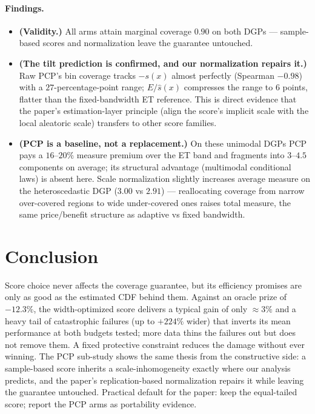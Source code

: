 \documentclass[11pt]{article}
\begin{document}
\paragraph{Findings.}
\begin{itemize}
  \item[\textbf{F5}] \textbf{(Validity.)} All arms attain marginal coverage
  $0.90$ on both DGPs --- sample-based scores and normalization leave the
  guarantee untouched.
  \item[\textbf{F6}] \textbf{(The tilt prediction is confirmed, and our
  normalization repairs it.)} Raw PCP's bin coverage tracks $-s(x)$ almost
  perfectly (Spearman $-0.98$) with a $27$-percentage-point range;
  $E/\hat s(x)$ compresses the range to $6$ points, flatter than the
  fixed-bandwidth ET reference. This is direct evidence that the paper's
  estimation-layer principle (align the score's implicit scale with the
  local aleatoric scale) transfers to other score families.
  \item[\textbf{F7}] \textbf{(PCP is a baseline, not a replacement.)} On
  these unimodal DGPs PCP pays a $16$--$20\%$ measure premium over the ET
  band and fragments into $3$--$4.5$ components on average; its structural
  advantage (multimodal conditional laws) is absent here. Scale
  normalization slightly increases average measure on the heteroscedastic
  DGP ($3.00$ vs $2.91$) --- reallocating coverage from narrow over-covered
  regions to wide under-covered ones raises total measure, the same
  price/benefit structure as adaptive vs fixed bandwidth.
\end{itemize}

\section{Conclusion}

Score choice never affects the coverage guarantee, but its efficiency
promises are only as good as the estimated CDF behind them. Against an
oracle prize of $-12.3\%$, the width-optimized score delivers a typical gain
of only $\approx 3\%$ and a heavy tail of catastrophic failures (up to
$+224\%$ wider) that inverts its mean performance at both budgets tested;
more data thins the failures out but does not remove them. A fixed
protective constraint reduces the damage without ever winning. The PCP
sub-study shows the same thesis from the constructive side: a sample-based
score inherits a scale-inhomogeneity exactly where our analysis predicts,
and the paper's replication-based normalization repairs it while leaving the
guarantee untouched. Practical default for the paper: keep the equal-tailed
score; report the PCP arms as portability evidence.
\end{document}
